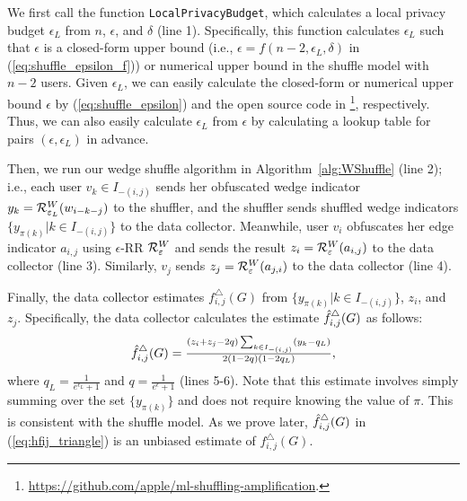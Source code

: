 We first call the function \texttt{LocalPrivacyBudget}, which calculates a local privacy budget $\epsilon_L$ from $n$, $\epsilon$, and $\delta$ (line 1).
Specifically, this function calculates $\epsilon_L$
such that $\epsilon$ is a closed-form upper bound (i.e., $\epsilon = f(n-2, \epsilon_L, \delta)$ in (\ref{eq:shuffle_epsilon_f})) or numerical upper bound in the shuffle model with $n-2$ users.
Given $\epsilon_L$, we can easily calculate the closed-form or numerical upper bound $\epsilon$ by (\ref{eq:shuffle_epsilon}) and the open source code in \cite{Feldman_FOCS21}\footnote{\url{https://github.com/apple/ml-shuffling-amplification}.}, respectively.
Thus, we can also easily calculate $\epsilon_L$ from $\epsilon$ by calculating a lookup table for pairs $(\epsilon, \epsilon_L)$ in advance.

Then, we run our wedge shuffle algorithm \AlgWS{} in Algorithm~\ref{alg:WShuffle} (line 2); i.e., each user $v_k \in I_{-(i,j)}$ sends her obfuscated wedge indicator
$y_k = \mathcal{R}_{\varepsilon_L}^W(w_{i-k-j})$ to the shuffler, and the shuffler sends
shuffled wedge indicators $\{y_{\pi(k)} | k \in I_{-(i,j)}\}$ to the data collector.
Meanwhile, user $v_i$ obfuscates her edge indicator $a_{i,j}$ using $\epsilon$-RR $\mathcal{R}_{\varepsilon}^W$ and sends the result $z_i = \mathcal{R}_{\varepsilon}^W(a_{i,j})$ to the data collector
(line 3).
Similarly, $v_j$ sends $z_j = \mathcal{R}_{\varepsilon}^W(a_{j,i})$ to the data collector (line 4).


Finally, the data collector estimates $f_{i,j}^\triangle(G)$ from $\{y_{\pi(k)} | k \in I_{-(i,j)}\}$, $z_i$, and $z_j$.
Specifically, the data collector calculates the estimate $\hat{f}_{i,j}^\triangle(G)$ as follows:
\begin{align}
    \textstyle{\hat{f}_{i,j}^\triangle(G) = \frac{(z_i+z_j-2q)\sum_{k \in I_{-(i,j)}} (y_{k} -
    q_L)}{2(1-2q)(1-2q_L)},}
    \label{eq:hfij_triangle}
\end{align}
where $q_L = \frac{1}{e^{\epsilon_L}+1}$ and $q = \frac{1}{e^\epsilon+1}$ (lines 5-6).
Note that this estimate involves simply summing over the set $\{y_{\pi(k)}\}$ and does not require knowing the value of $\pi$. This is
consistent with the shuffle model.
As we prove later, $\hat{f}_{i,j}^\triangle(G)$ in (\ref{eq:hfij_triangle}) is an unbiased estimate of $f_{i,j}^\triangle(G)$.

